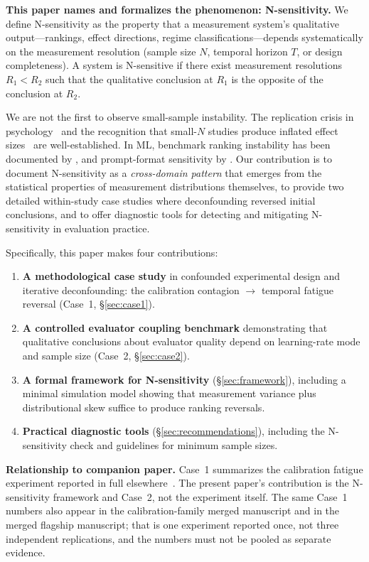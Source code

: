 \documentclass[11pt]{article}
\begin{document}
\textbf{This paper names and formalizes the phenomenon: N-sensitivity.} We define N-sensitivity as the property that a measurement system's qualitative output---rankings, effect directions, regime classifications---depends systematically on the measurement resolution (sample size $N$, temporal horizon $T$, or design completeness). A system is N-sensitive if there exist measurement resolutions $R_1 < R_2$ such that the qualitative conclusion at $R_1$ is the opposite of the conclusion at $R_2$.

We are not the first to observe small-sample instability. The replication crisis in psychology~\cite{ioannidis2005most} and the recognition that small-$N$ studies produce inflated effect sizes~\cite{button2013power} are well-established. In ML, benchmark ranking instability has been documented by \citet{dodge2019reproducibility}, and prompt-format sensitivity by \citet{sclar2024quantifying}. Our contribution is to document N-sensitivity as a \emph{cross-domain pattern} that emerges from the statistical properties of measurement distributions themselves, to provide two detailed within-study case studies where deconfounding reversed initial conclusions, and to offer diagnostic tools for detecting and mitigating N-sensitivity in evaluation practice.

Specifically, this paper makes four contributions:
\begin{enumerate}[leftmargin=*,nosep]
    \item \textbf{A methodological case study} in confounded experimental design and iterative deconfounding: the calibration contagion $\to$ temporal fatigue reversal (Case~1, \S\ref{sec:case1}).
    \item \textbf{A controlled evaluator coupling benchmark} demonstrating that qualitative conclusions about evaluator quality depend on learning-rate mode and sample size (Case~2, \S\ref{sec:case2}).
    \item \textbf{A formal framework for N-sensitivity} (\S\ref{sec:framework}), including a minimal simulation model showing that measurement variance plus distributional skew suffice to produce ranking reversals.
    \item \textbf{Practical diagnostic tools} (\S\ref{sec:recommendations}), including the N-sensitivity check and guidelines for minimum sample sizes.
\end{enumerate}

\textbf{Relationship to companion paper.} Case~1 summarizes the calibration fatigue experiment reported in full elsewhere~\cite{liu2026calibrationcontagion}. The present paper's contribution is the N-sensitivity framework and Case~2, not the experiment itself. The same Case~1 numbers also appear in the calibration-family merged manuscript and in the merged flagship manuscript; that is one experiment reported once, not three independent replications, and the numbers must not be pooled as separate evidence.
\end{document}
